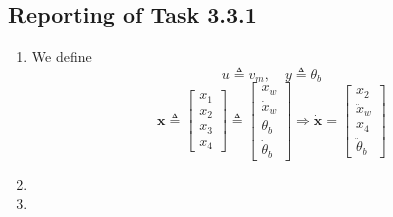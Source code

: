 \documentclass[11pt]{article} %
\begin{document}
\subsection*{Reporting of Task 3.3.1}
\begin{enumerate}
\item %
  We define
  \begin{equation}
    u \triangleq v_m, \quad
    y \triangleq \theta_b
  \end{equation}
  \begin{equation}
    \bm{x} \triangleq \begin{bmatrix}
      x_1\\
      x_2\\
      x_3\\
      x_4
    \end{bmatrix}
    \triangleq
    \begin{bmatrix}
      x_w\\
      \dot{x}_w\\
      \theta_b\\
      \dot{\theta}_b
    \end{bmatrix}
    \Rightarrow
    \bm{\dot{x}} =
    \begin{bmatrix}
      x_2\\
      \ddot{x}_w\\
      x_4\\
      \ddot{\theta}_b
    \end{bmatrix}
  \end{equation}
\item %
\item %
\end{enumerate}
\end{document}

